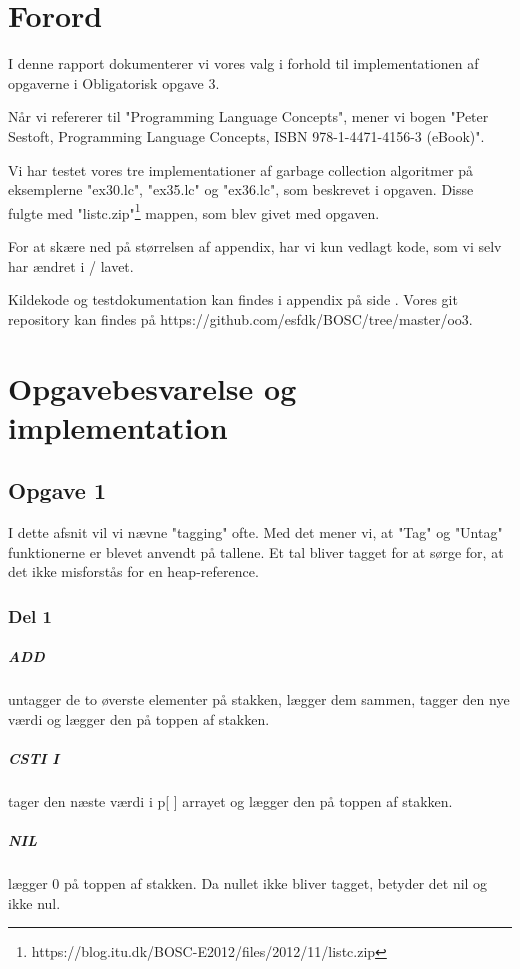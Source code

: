 \chapter{Forord}
I denne rapport dokumenterer vi vores valg i forhold til implementationen af opgaverne i Obligatorisk opgave 3.

Når vi refererer til "Programming Language Concepts", mener vi bogen "Peter Sestoft, Programming Language Concepts, ISBN 978-1-4471-4156-3 (eBook)".

Vi har testet vores tre implementationer af garbage collection algoritmer på eksemplerne "ex30.lc", "ex35.lc" og "ex36.lc", som beskrevet i opgaven. Disse fulgte med "listc.zip"\footnote{https://blog.itu.dk/BOSC-E2012/files/2012/11/listc.zip} mappen, som blev givet med opgaven. 

For at skære ned på størrelsen af appendix, har vi kun vedlagt kode, som vi selv har ændret i / lavet.

Kildekode og testdokumentation kan findes i appendix på side \pageref{Appendix}. Vores git repository kan findes på https://github.com/esfdk/BOSC/tree/master/oo3.

\chapter{Opgavebesvarelse og implementation}
\section{Opgave 1}
\label{O1}
I dette afsnit vil vi nævne "tagging" ofte. Med det mener vi, at "Tag" og "Untag" funktionerne er blevet anvendt på tallene. Et tal bliver tagget for at sørge for, at det ikke misforstås for en heap-reference.
\subsection{Del 1}
\label{O1_1}
\paragraph{ADD} untagger de to øverste elementer på stakken, lægger dem sammen, tagger den nye værdi og lægger den på toppen af stakken.
\paragraph{CSTI I} tager den næste værdi i p[ ] arrayet og lægger den på toppen af stakken.
\paragraph{NIL} lægger 0 på toppen af stakken. Da nullet ikke bliver tagget, betyder det nil og ikke nul.
